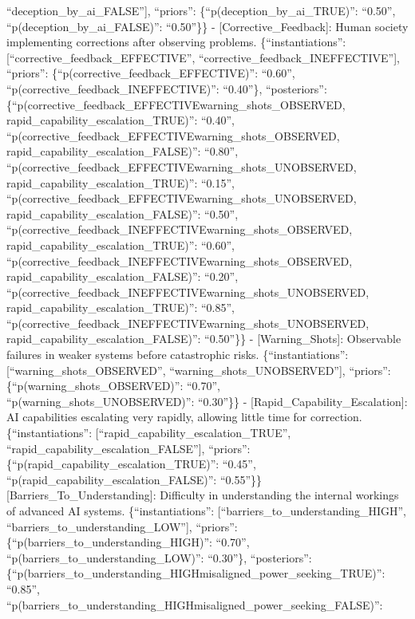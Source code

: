 \documentclass[
  11pt,
  letterpaper,
]{book}
\begin{document}
``deception\_by\_ai\_FALSE''{]}, ``priors'':
\{``p(deception\_by\_ai\_TRUE)'': ``0.50'',
``p(deception\_by\_ai\_FALSE)'': ``0.50''\}\} -
{[}Corrective\_Feedback{]}: Human society implementing corrections after
observing problems. \{``instantiations'':
{[}``corrective\_feedback\_EFFECTIVE'',
``corrective\_feedback\_INEFFECTIVE''{]}, ``priors'':
\{``p(corrective\_feedback\_EFFECTIVE)'': ``0.60'',
``p(corrective\_feedback\_INEFFECTIVE)'': ``0.40''\}, ``posteriors'':
\{``p(corrective\_feedback\_EFFECTIVE\textbar warning\_shots\_OBSERVED,
rapid\_capability\_escalation\_TRUE)'': ``0.40'',
``p(corrective\_feedback\_EFFECTIVE\textbar warning\_shots\_OBSERVED,
rapid\_capability\_escalation\_FALSE)'': ``0.80'',
``p(corrective\_feedback\_EFFECTIVE\textbar warning\_shots\_UNOBSERVED,
rapid\_capability\_escalation\_TRUE)'': ``0.15'',
``p(corrective\_feedback\_EFFECTIVE\textbar warning\_shots\_UNOBSERVED,
rapid\_capability\_escalation\_FALSE)'': ``0.50'',
``p(corrective\_feedback\_INEFFECTIVE\textbar warning\_shots\_OBSERVED,
rapid\_capability\_escalation\_TRUE)'': ``0.60'',
``p(corrective\_feedback\_INEFFECTIVE\textbar warning\_shots\_OBSERVED,
rapid\_capability\_escalation\_FALSE)'': ``0.20'',
``p(corrective\_feedback\_INEFFECTIVE\textbar warning\_shots\_UNOBSERVED,
rapid\_capability\_escalation\_TRUE)'': ``0.85'',
``p(corrective\_feedback\_INEFFECTIVE\textbar warning\_shots\_UNOBSERVED,
rapid\_capability\_escalation\_FALSE)'': ``0.50''\}\} -
{[}Warning\_Shots{]}: Observable failures in weaker systems before
catastrophic risks. \{``instantiations'':
{[}``warning\_shots\_OBSERVED'', ``warning\_shots\_UNOBSERVED''{]},
``priors'': \{``p(warning\_shots\_OBSERVED)'': ``0.70'',
``p(warning\_shots\_UNOBSERVED)'': ``0.30''\}\} -
{[}Rapid\_Capability\_Escalation{]}: AI capabilities escalating very
rapidly, allowing little time for correction. \{``instantiations'':
{[}``rapid\_capability\_escalation\_TRUE'',
``rapid\_capability\_escalation\_FALSE''{]}, ``priors'':
\{``p(rapid\_capability\_escalation\_TRUE)'': ``0.45'',
``p(rapid\_capability\_escalation\_FALSE)'': ``0.55''\}\}
{[}Barriers\_To\_Understanding{]}: Difficulty in understanding the
internal workings of advanced AI systems. \{``instantiations'':
{[}``barriers\_to\_understanding\_HIGH'',
``barriers\_to\_understanding\_LOW''{]}, ``priors'':
\{``p(barriers\_to\_understanding\_HIGH)'': ``0.70'',
``p(barriers\_to\_understanding\_LOW)'': ``0.30''\}, ``posteriors'':
\{``p(barriers\_to\_understanding\_HIGH\textbar misaligned\_power\_seeking\_TRUE)'':
``0.85'',
``p(barriers\_to\_understanding\_HIGH\textbar misaligned\_power\_seeking\_FALSE)'':
\end{document}
